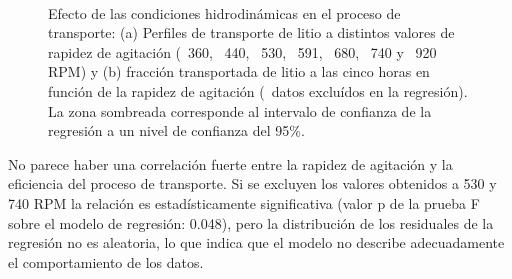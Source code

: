\begin{figure}[H]
    \centering
    \\
    \caption[Efecto de las condiciones hidrodinámicas en el proceso de transporte.]{Efecto de las condiciones hidrodinámicas en el proceso de transporte: (a) Perfiles de transporte de litio a distintos valores de rapidez de agitación (\protect\squareblck\ 360, \protect\circleblck\ 440, \protect\triangleupblck\ 530, \protect\circlewht\ 591, \protect\squarewht\ 680, \protect\squarerttdwht\ 740 y \protect\triangleupwht\ 920 RPM) y (b) fracción transportada de litio a las cinco horas en función de la rapidez de agitación (\protect\triangleupblck\ datos excluídos en la regresión). La zona sombreada corresponde al intervalo de confianza de la regresión a un nivel de confianza del 95\%.}
    \label{fig:RPM1}
\end{figure}

No parece haber una correlación fuerte entre la rapidez de agitación y la eficiencia del proceso de transporte. Si se excluyen los valores obtenidos a 530 y 740 RPM la relación es estadísticamente significativa (valor p de la prueba F sobre el modelo de regresión: 0.048), pero la distribución de los residuales de la regresión no es aleatoria, lo que indica que el modelo no describe adecuadamente el comportamiento de los datos. 

